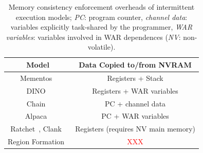 \begin{table}
	\centering
	\footnotesize
	\begin{tabular}{|c|c|}
		\hline
		Model & Data Copied to/from NVRAM \\
		\hline\hline
		Mementos~\cite{mementos}	& Registers + Stack     \\
		DINO~\cite{dino}	& Registers + WAR variables \\
		Chain~\cite{chain}	& PC + channel data\\
		Alpaca~\cite{alpaca}	& PC + WAR variables \\
		Ratchet~\cite{ratchet}, Clank~\cite{hicks_isca_2017} & Registers (requires NV main memory) \\
		Region Formation~\cite{baghsorkhi_cgo_2018} & \textcolor{red}{XXX} \\
		\hline
	\end{tabular}
	\caption{Memory consistency enforcement overheads of intermittent execution models; \emph{PC}: program counter, \emph{channel data}: variables explicitly task-shared by the programmer, \emph{WAR variables}: variables involved in WAR dependences (\emph{NV}: non-volatile).}
	\label{table:chechpoint_comparison}
\end{table}


